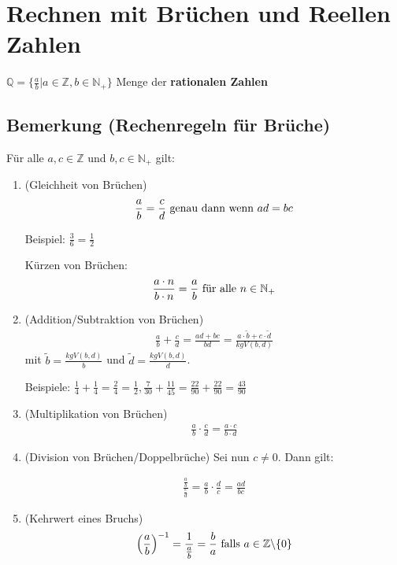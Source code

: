 \section{Rechnen mit Brüchen und Reellen Zahlen}

$\mathbb{Q} = \{ \frac{a}{b}| a \in \mathbb{Z}, b \in \mathbb{N_+} \}$ Menge der \textbf{rationalen Zahlen}

\subsection[Rechenregeln für Brüche]{Bemerkung (Rechenregeln für Brüche)}

	Für alle $a,c \in \mathbb{Z}$ und $b,c\in \mathbb{N_+}$ gilt:
	
	\begin{enumerate}
	
	\item (Gleichheit von Brüchen)\\
		\begin{align*}
			\frac{a}{b} = \frac{c}{d} \textnormal{ genau dann wenn } ad=bc
		\end{align*}
		
		Beispiel: $\frac{3}{6}=\frac{1}{2}$ \newline
		
		Kürzen von Brüchen:
		\begin{align*}
			\frac{a\cdot n}{b\cdot n} = \frac{a}{b} \textnormal{ für alle } n \in \mathbb{N_+}
		\end{align*}
		
		
	\item (Addition/Subtraktion von Brüchen)
		\begin{align*}
			\frac{a}{b} + \frac{c}{d} = \frac{ad+bc}{bd} = \frac{a\cdot\tilde{b}+c\cdot \tilde{d}}{kgV(b,d)}
		\end{align*}
		mit $\tilde{b}=\frac{kgV(b,d)}{b}$ und $\tilde{d}=\frac{kgV(b,d)}{d}$. \newline
		
		Beispiele: $\frac{1}{4}+\frac{1}{4}=\frac{2}{4}=\frac{1}{2}, 
		\frac{7}{30}+\frac{11}{45}=\frac{22}{90}+\frac{22}{90}=\frac{43}{90}$
		
	\item (Multiplikation von Brüchen)
		\begin{align*}
			\frac{a}{b} \cdot \frac{c}{d} = \frac{a\cdot c}{b\cdot d}
		\end{align*}			
	
	\item (Division von Brüchen/Doppelbrüche)
		Sei nun $c\neq 0$. Dann gilt:
		
		\begin{align*}
			\frac{\frac{a}{b}}{\frac{c}{d}}= \frac{a}{b}\cdot \frac{d}{c}=\frac{ad}{bc}
		\end{align*}
		
	\item (Kehrwert eines Bruchs)
		\begin{align*}
		\left( \frac{a}{b} \right) ^{-1} = \frac{1}{\frac{a}{b}}=\frac{b}{a}
			\textnormal{ falls } a \in \mathbb{Z}\backslash\{0\}
		\end{align*}
			
	\end{enumerate}
	

